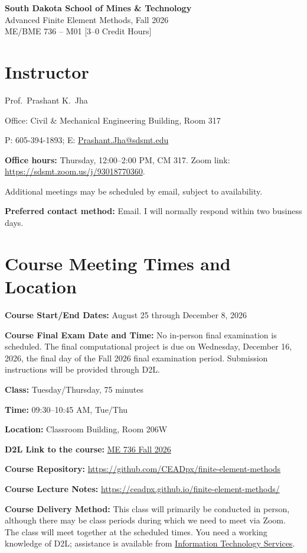 \documentclass[12pt]{article}
\newcommand{\coursefield}[2]{%
  \vspace{0.2em}\noindent\textbf{#1} #2\par
}
\begin{document}
\pagestyle{syllabus}
\thispagestyle{syllabus}

\begin{center}
  {\bfseries \Large South Dakota School of Mines \& Technology}\\[-0.2em]
  \large
  Advanced Finite Element Methods, Fall 2026\\[-0.2em]
  ME/BME 736 -- M01 [3--0 Credit Hours]
\end{center}

\section{Instructor}
Prof.\ Prashant K.\ Jha

Office: Civil \& Mechanical Engineering Building, Room 317

P: 605-394-1893; E:
\href{mailto:Prashant.Jha@sdsmt.edu}{Prashant.Jha@sdsmt.edu}

\coursefield{Office hours:}{Thursday, 12:00--2:00 PM, CM 317. Zoom link: \href{https://sdsmt.zoom.us/j/93018770360}{https://sdsmt.zoom.us/j/93018770360}.}
Additional meetings may be scheduled by email, subject to availability.

\coursefield{Preferred contact method:}{Email. I will normally respond within two business days.}

\section{Course Meeting Times and Location}
\coursefield{Course Start/End Dates:}{August 25 through December 8, 2026}
\coursefield{Course Final Exam Date and Time:}{No in-person final examination is scheduled. The final computational project is due on Wednesday, December 16, 2026, the final day of the Fall 2026 final examination period. Submission instructions will be provided through D2L.}
\coursefield{Class:}{Tuesday/Thursday, 75 minutes}
\coursefield{Time:}{09:30--10:45 AM, Tue/Thu}
\coursefield{Location:}{Classroom Building, Room 206W}
\coursefield{D2L Link to the course:}{\href{https://d2l.sdbor.edu/d2l/home/2208049}{ME 736 Fall 2026}}
\coursefield{Course Repository:}{\href{https://github.com/CEADpx/finite-element-methods}{https://github.com/CEADpx/finite-element-methods}}
\coursefield{Course Lecture Notes:}{\href{https://ceadpx.github.io/finite-element-methods/}{https://ceadpx.github.io/finite-element-methods/}}

\coursefield{Course Delivery Method:}{This class will primarily be conducted in person, although there may be class periods during which we need to meet via Zoom. The class will meet together at the scheduled times. You need a working knowledge of D2L; assistance is available from \href{https://www.sdsmt.edu/about/offices-and-administration/information-technology-services.html}{Information Technology Services}.}
\end{document}
